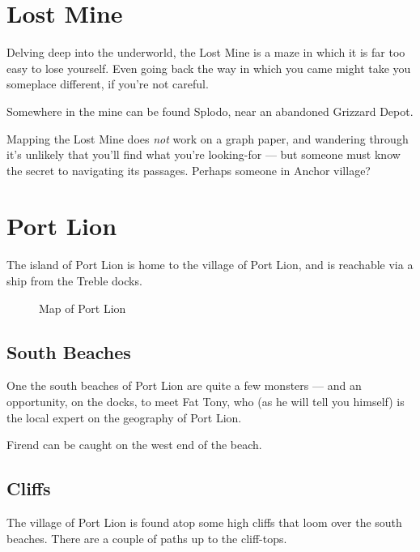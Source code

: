 \documentclass[10pt,twocolumn]{memoir}
\begin{document}
\section{Lost Mine}

Delving deep into the underworld, the Lost Mine is a maze in which it is far too
easy to lose yourself. Even going back the  way in which you came might take you
someplace different, if you're not careful.

Somewhere in the mine can be found Splodo, near an abandoned Grizzard Depot.

Mapping  the Lost  Mine does  \emph{not} work  on a  graph paper,  and wandering
through it's unlikely  that you'll find what you're looking-for  --- but someone
must know the secret to navigating its passages. Perhaps someone in Anchor village?

\section{Port Lion}

The island of  Port Lion is home to  the village of Port Lion,  and is reachable
via a ship from the Treble docks.

\begin{figure}[ht]
  \begin{center}
  \end{center}
  \caption{Map of Port Lion}
\end{figure}

\subsection{South Beaches}

One  the south  beaches  of  Port Lion  are  quite a  few  monsters  --- and  an
opportunity, on the docks,  to meet Fat Tony, who (as he  will tell you himself)
is the local expert on the geography of Port Lion.

Firend can be caught on the west end of the beach.

\subsection{Cliffs}

The village  of Port  Lion is  found atop some  high cliffs  that loom  over the
south beaches. There are a couple of paths up to the cliff-tops.
\end{document}
